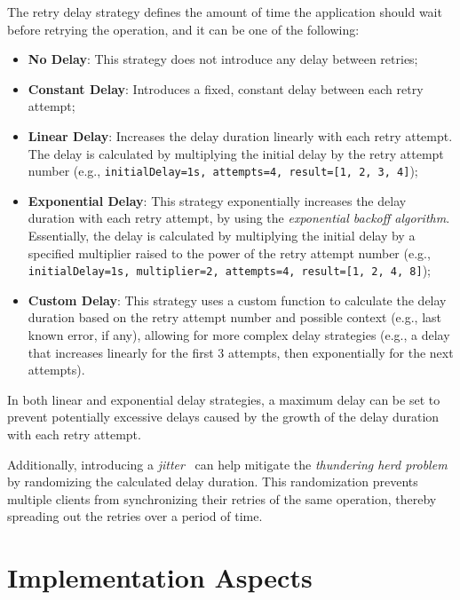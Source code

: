 The retry delay strategy defines the amount of time the application should wait before retrying the operation, and it can be one of the following:

\begin{itemize}
    \item \textbf{No Delay}: This strategy does not introduce any delay between retries;
    \item \textbf{Constant Delay}: Introduces a fixed, constant delay between each retry attempt;
    \item \textbf{Linear Delay}: Increases the delay duration linearly with each retry attempt.
    The delay is calculated by multiplying the initial delay by the retry attempt number
    (e.g., \texttt{initialDelay=1s, attempts=4, result=[1, 2, 3, 4]});
    \item \textbf{Exponential Delay}: This strategy exponentially increases the delay duration with each retry attempt,
    by using the \textit{exponential backoff algorithm}.
    Essentially, the delay is calculated by multiplying the initial delay by a specified multiplier raised to the power of the retry attempt number (e.g., \texttt{initialDelay=1s, multiplier=2, attempts=4, result=[1, 2, 4, 8]});
    \item \textbf{Custom Delay}: This strategy uses a custom function to calculate the delay duration based on the retry attempt number and possible context (e.g., last known error, if any), allowing for more complex delay strategies (e.g., a delay that increases linearly for the first 3 attempts, then exponentially for the next attempts).
\end{itemize}

In both linear and exponential delay strategies,
a maximum delay can be set
to prevent potentially excessive delays caused by the growth of the delay duration with each retry attempt.

Additionally,
introducing a \textit{jitter}~\cite{aws-exponential-backoff-jitter} can help
mitigate the \textit{thundering herd problem}~\cite{thundering-herd-problem} by randomizing the calculated delay duration.
This randomization prevents multiple clients from synchronizing their retries of the same operation,
thereby spreading out the retries over a period of time.


\section{Implementation Aspects}\label{sec:retry-implementation-aspects}

